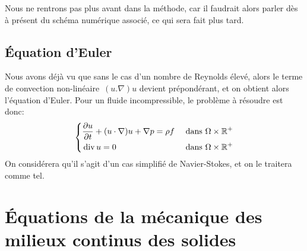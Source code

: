 Nous ne rentrons pas plus avant dans la méthode, car il faudrait alors parler dès à présent du schéma numérique associé, ce qui sera fait plus tard.

\medskip
\subsection{Équation d'Euler}
Nous avons déjà vu que sans le cas d'un nombre de Reynolds élevé, alors le terme de convection non-linéaire~$(u.\nabla)u$ devient prépondérant, et on obtient alors l'équation d'Euler. Pour un fluide incompressible, le problème à résoudre est donc:
\begin{equation}\left\{
\begin{aligned}
&\dfrac{\partial u}{\partial t} + (u\cdot\nabla) u + \nabla p = \rho f && \text{ dans } \Omega\times\mathbb R^+\\
&\operatorname{div} u = 0&& \text{ dans } \Omega\times\mathbb R^+
\end{aligned}\right.
\end{equation}
On considérera qu'il s'agit d'un cas simplifié de Navier-Stokes, et on le traitera comme tel.

\medskip
\section{Équations de la mécanique des milieux continus des solides}
\medskip
